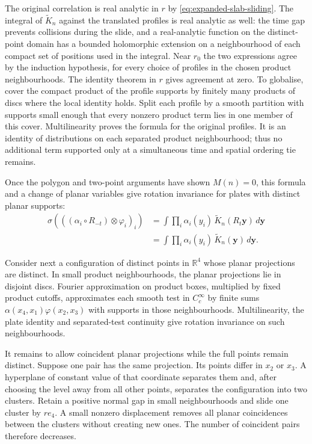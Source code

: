 \documentclass[11pt,letterpaper,reqno]{amsart}
\theoremstyle{definition}
\theoremstyle{remark}
\newcommand{\R}{\mathbb R}
\begin{document}
The original correlation is real analytic in $r$ by
\eqref{eq:expanded-slab-sliding}. The integral of
$\widetilde K_n$ against the translated profiles is real analytic
as well: the time gap prevents collisions during the slide, and a
real-analytic function on the distinct-point domain has a bounded
holomorphic extension on a neighbourhood of each compact set of
positions used in the integral. Near $r_0$ the two expressions agree
by the induction hypothesis, for every choice of profiles in the
chosen product neighbourhoods. The identity theorem in $r$ gives
agreement at zero. To globalise, cover the compact product of the
profile supports by finitely many products of discs where the local
identity holds. Split each profile by a smooth partition with supports
small enough that every nonzero product term lies in one member of
this cover. Multilinearity proves the formula for the original
profiles. It is an identity of distributions on each separated
product neighbourhood; thus no additional term
supported only at a simultaneous time and spatial ordering tie
remains.

Once the polygon and two-point arguments have shown $M(n)=0$, this
formula and a change of planar variables give rotation invariance
for plates with distinct planar supports:
\[
 \begin{split}
 \sigma(((\alpha_i\circ R_{-t})\otimes\varphi_i)_i)
 &=\int\prod_i\alpha_i(y_i)\,
                             \widetilde K_n(R_t\mathbf y)\,d\mathbf y\\
 &=\int\prod_i\alpha_i(y_i)\,
                             \widetilde K_n(\mathbf y)\,d\mathbf y.
 \end{split}
\]

Consider next a configuration of distinct points in $\R^4$ whose
planar projections are distinct. In small product neighbourhoods,
the planar projections lie in disjoint discs. Fourier approximation
on product boxes, multiplied by fixed product cutoffs, approximates
each smooth test in $C_c^\infty$ by finite sums
$\alpha(x_4,x_1)\varphi(x_2,x_3)$ with supports in those
neighbourhoods. Multilinearity, the plate identity and separated-test
continuity give rotation invariance on such neighbourhoods.

It remains to allow coincident planar projections while the full
points remain distinct. Suppose one pair has the same projection.
Its points differ in $x_2$ or $x_3$. A hyperplane of constant value
of that coordinate separates them and, after choosing the level
away from all other points, separates the configuration into two
clusters. Retain a positive normal gap in small neighbourhoods and
slide one cluster by $re_4$. A small nonzero displacement removes
all planar coincidences between the clusters without creating new
ones. The number of coincident pairs therefore decreases.
\end{document}

